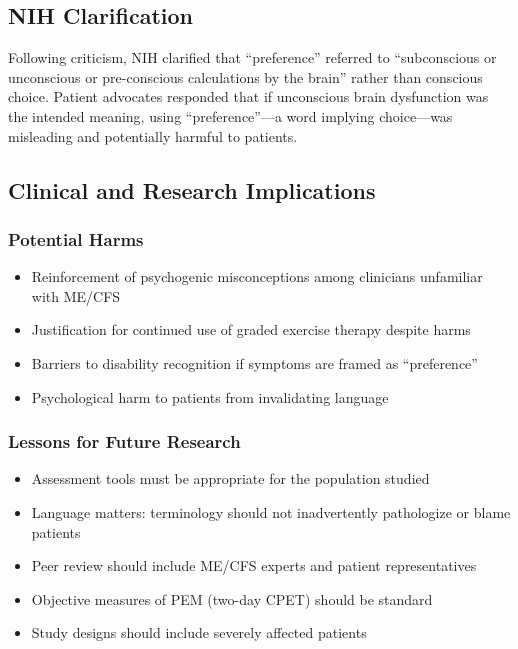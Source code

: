 \subsection{NIH Clarification}

Following criticism, NIH clarified that ``preference'' referred to ``subconscious or unconscious or pre-conscious calculations by the brain'' rather than conscious choice. Patient advocates responded that if unconscious brain dysfunction was the intended meaning, using ``preference''---a word implying choice---was misleading and potentially harmful to patients.

\subsection{Clinical and Research Implications}

\subsubsection{Potential Harms}
\begin{itemize}
    \item Reinforcement of psychogenic misconceptions among clinicians unfamiliar with ME/CFS
    \item Justification for continued use of graded exercise therapy despite harms
    \item Barriers to disability recognition if symptoms are framed as ``preference''
    \item Psychological harm to patients from invalidating language
\end{itemize}

\subsubsection{Lessons for Future Research}
\begin{itemize}
    \item Assessment tools must be appropriate for the population studied
    \item Language matters: terminology should not inadvertently pathologize or blame patients
    \item Peer review should include ME/CFS experts and patient representatives
    \item Objective measures of PEM (two-day CPET) should be standard
    \item Study designs should include severely affected patients
\end{itemize}

